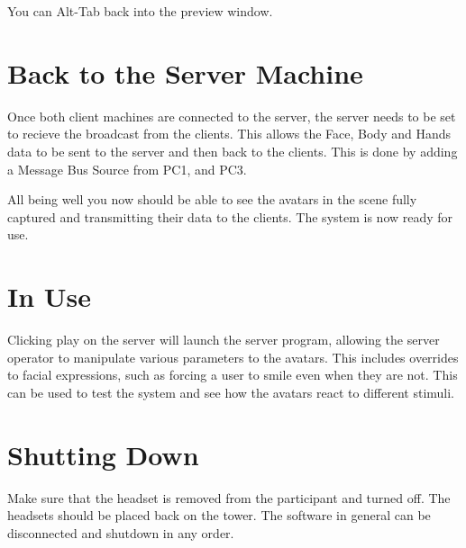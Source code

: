 You can Alt-Tab back into the preview window.

\section{Back to the Server Machine}
Once both client machines are connected to the server, the server needs to be set to recieve the broadcast from the clients. This allows the Face, Body and Hands data to be sent to the server and then back to the clients. This is done by adding a Message Bus Source from PC1, and PC3.

All being well you now should be able to see the avatars in the scene fully captured and transmitting their data to the clients. The system is now ready for use.

\section{In Use}
Clicking play on the server will launch the server program, allowing the server operator to manipulate various parameters to the avatars. This includes overrides to facial expressions, such as forcing a user to smile even when they are not. This can be used to test the system and see how the avatars react to different stimuli.

\section{Shutting Down}
Make sure that the headset is removed from the participant and turned off. The headsets should be placed back on the tower. The software in general can be disconnected and shutdown in any order.